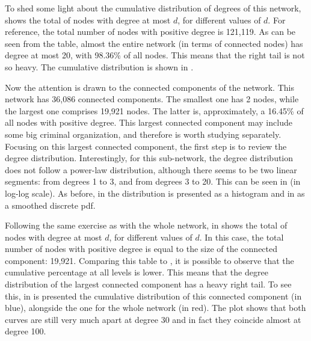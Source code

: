 \documentclass[11pt, english]{article}
\begin{document}
\begin{multicols}{2}
To shed some light about the cumulative distribution of degrees of this network,  shows the total of nodes with degree at most $d$, for different values of $d$. For reference, the total number of nodes with positive degree is 121,119. As can be seen from the table, almost the entire network (in terms of connected nodes) has degree at most 20, with 98.36\% of all nodes. This means that the right tail is not so heavy. The cumulative distribution is shown in .

Now the attention is drawn to the connected components of the network. This network has 36,086 connected components. The smallest one has 2 nodes, while the largest one comprises 19,921 nodes. The latter is, approximately, a 16.45\% of all nodes with positive degree. This largest connected component may include some big criminal organization, and therefore is worth studying separately. Focusing on this largest connected component, the first step is to review the degree distribution. Interestingly, for this sub-network, the degree distribution does not follow a power-law distribution, although there seems to be two linear segments: from degrees 1 to 3, and from degrees 3 to 20. This can be seen in  (in log-log scale). As before, in  the distribution is presented as a histogram and in  as a smoothed discrete pdf. 

Following the same exercise as with the whole network, in  shows the total of nodes with degree at most $d$, for different values of $d$. In this case, the total number of nodes with positive degree is equal to the size of the connected component: 19,921. Comparing this table to , it is possible to observe that the cumulative percentage at all levels is lower. This means that the degree distribution of the largest connected component has a heavy right tail. To see this, in  is presented the cumulative distribution of this connected component (in blue), alongside the one for the whole network (in red). The plot shows that both curves are still very much apart at degree 30 and in fact they coincide almost at degree 100.


\end{multicols}
\end{document}
